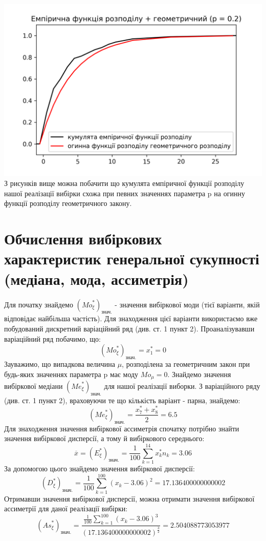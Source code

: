 \documentclass{article}
\begin{document}
\newline
\includegraphics[scale = 0.8]{func+geom4}
\newline
З рисунків вище можна побачити що кумулята емпіричної функції
розподілу нашої реалізації вибірки схожа при певних значеннях
параметра p на огинну функції розподілу геометричного закону.
\section{Обчислення вибіркових характеристик генеральної 
сукупності (медіана, мода, ассиметрія)}
Для початку знайдемо $({Mo}_\xi^*)_{\text{знач.}}$ - 
значення вибіркової моди (тієї варіанти, якій відповідає 
найбільша частість). Для знаходження цієї варіанти використаємо
вже побудований дискретний варіаційний ряд (див. ст. 1 пункт 2).
Проаналізувавши варіаційний ряд побачимо, що:
$$({Mo}_\xi^*)_{\text{знач.}} = x_1^* = 0$$
\newpage
Зауважимо, що випадкова величина $\mu$, розподілена за 
геометричним закон при будь-яких значеннях параметра p
має моду ${Mo}_\mu = 0$.
\newline
\newline
Знайдемо значення вибіркової медіани $({Me}_\xi^*)_{\text{знач.}}$ 
для нашої реалізації виборки. З варіаційного ряду (див. ст. 1 
пункт 2), враховуючи те що кількість варіант - парна, 
знайдемо:$$ ({Me}_\xi^*)_{\text{знач.}} = \frac{x_7^* + x_8^*}
{2} = 6.5 $$
\newline
Для знаходження значення вибіркової ассиметрія спочатку потрібно 
знайти значення вибіркової дисперсії, а тому й вибіркового середнього: 
$$\overline{x} = (E^*_{\xi})_{\text{знач.}} = \frac{1}{100} 
\sum_{k = 1}^{14} x_k^* n_k = 3.06$$
За допомогою цього знайдемо значення вибіркової дисперсії:
$$(D^*_{\xi})_{\text{знач.}} = \frac{1}{100} \sum_{k = 1}^{100}
(x_k - 3.06)^2 = 17.136400000000002$$
Отримавши значення вибіркової дисперсії, можна отримати значення
вибіркової ассиметрії для даної реалізації вибірки:
$$({As}_{\xi}^*)_{\text{знач.}} = \frac{\frac{1}{100}
\sum_{k = 1}^{100}(x_k - 3.06)^3}{(17.136400000000002)^
{\frac{3}{2}}} = 2.504088773053977$$
\end{document}
